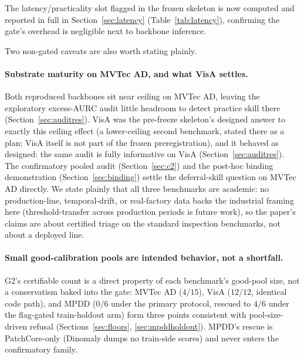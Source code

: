 \documentclass[11pt]{article}
\begin{document}
The latency/practicality slot flagged in the frozen skeleton is now computed and reported in full
in Section~\ref{sec:latency} (Table~\ref{tab:latency}), confirming the gate's overhead is
negligible next to backbone inference.

Two non-gated caveats are also worth stating plainly.

\paragraph{Substrate maturity on MVTec AD, and what VisA settles.} Both reproduced backbones sit
near ceiling on MVTec AD, leaving the exploratory excess-AURC audit little headroom to detect
practice skill there (Section~\ref{sec:auditres}). VisA was the pre-freeze skeleton's designed
answer to exactly this ceiling effect (a lower-ceiling second benchmark, stated there as a plan;
VisA itself is not part of the frozen preregistration), and it behaved as designed: the same
audit is fully informative on VisA (Section~\ref{sec:auditres}). The confirmatory pooled audit
(Section~\ref{sec:c2}) and the post-hoc binding demonstration (Section~\ref{sec:binding}) settle
the deferral-skill question on MVTec AD directly. We state plainly that all three benchmarks are
academic: no production-line, temporal-drift, or real-factory data backs the industrial framing
here (threshold-transfer across production periods is future work), so the paper's claims are
about certified triage on the standard inspection benchmarks, not about a deployed line.

\paragraph{Small good-calibration pools are intended behavior, not a shortfall.} G2's certifiable
count is a direct property of each benchmark's good-pool size, not a conservatism baked into the
gate: MVTec AD ($4/15$), VisA ($12/12$, identical code path), and MPDD ($0/6$ under the primary
protocol, rescued to $4/6$ under the flag-gated train-holdout arm) form three points consistent
with pool-size-driven refusal (Sections~\ref{sec:floors}, \ref{sec:mpddholdout}). MPDD's rescue is
PatchCore-only (Dinomaly dumps no train-side scores) and never enters the confirmatory family.
\end{document}
